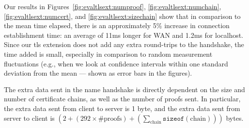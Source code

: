 Our results in Figures~\ref{fig:evaltlsext:numproof},
\ref{fig:evaltlsext:numchain}, \ref{fig:evaltlsext:numcert}, and
\ref{fig:evaltlsext:sizechain} show that in comparison to the mean time
elapsed, there is an approximately 5\% increase in connection establishment
time: an average of 11ms longer for WAN and 1.2ms for localhost. 
Since our \ac{tls} extension does not add any extra round-trips to the
handshake, the time added is small, especially in comparison to random
measurement fluctuations (e.g., when we look at confidence intervals within one
standard deviation from the mean --- shown as error bars in the figures).

The extra data sent in the \ac{name} handshake is directly dependent on the size
and number of certificate chains, as well as the number of proofs sent. In
particular, the extra data sent from client to server is 1 byte, and the extra
data sent from server to client is
$(2 + (292 \times \text{\#proofs}) +
(\sum_{\text{chain}}\texttt{sizeof}(\text{chain})))$ bytes. 
